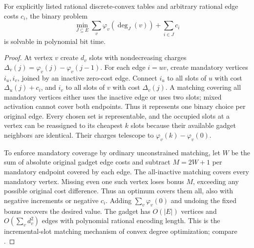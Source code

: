 \begin{proposition}\label{prop:cardinality-matching}
For explicitly listed rational discrete-convex tables and arbitrary
rational edge costs $c_i$, the binary problem
\[
 \min_{J\subseteq E}\sum_v\varphi_v(\deg_J(v))+\sum_{i\in J}c_i
\]
is solvable in polynomial bit time.
\end{proposition}
\begin{proof}
At vertex $v$ create $d_v$ slots with nondecreasing charges
$\Delta_v(j)=\varphi_v(j)-\varphi_v(j-1)$. For each edge $i=uv$, create
mandatory vertices $i_u,i_v$, joined by an inactive zero-cost edge.
Connect $i_u$ to all slots of $u$ with cost $\Delta_u(j)+c_i$, and
$i_v$ to all slots of $v$ with cost $\Delta_v(j)$. A matching covering
all mandatory vertices either uses the inactive edge or uses two slots;
mixed activation cannot cover both endpoints. Thus it represents one
binary choice per original edge. Every chosen set is representable,
and the occupied slots at a vertex can be reassigned to its cheapest
$k$ slots because their available gadget neighbors are identical.
Their charges telescope to $\varphi_v(k)-\varphi_v(0)$.

To enforce mandatory coverage by ordinary unconstrained matching, let
$W$ be the sum of absolute original gadget edge costs and subtract
$M=2W+1$ per mandatory endpoint covered by each edge. The all-inactive
matching covers every mandatory vertex. Missing even one such vertex
loses bonus $M$, exceeding any possible original cost difference.
Thus an optimum covers them all, also with negative increments or
negative $c_i$. Adding $\sum_v\varphi_v(0)$ and undoing the fixed bonus
recovers the desired value. The gadget has $O(|E|)$ vertices and
$O(\sum_vd_v^2)$ edges with polynomial rational encoding length.
This is the incremental-slot matching mechanism of convex degree
optimization; compare \citet[Theorem 1.2 and Section 3]{DezaOnn2021}.
\end{proof}

